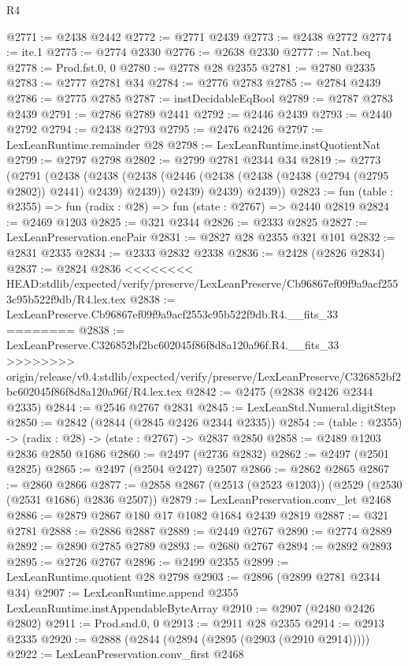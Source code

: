 \begin{lexlean}{R4}
\begin{coremodule}
{{{{{{{{{{{{{{{{{{{{{{{{{{{{{{{{{{{{{{{{{{{{{{{{{{{{{{{{{{{{{{{{{{{{{{{{{{{{{{{{{{{{{{{{{{{{@2771 := @2438 @2442
@2772 := @2771 @2439
@2773 := @2438 @2772
@2774 := ite.{1}
@2775 := @2774 @2330
@2776 := @2638 @2330
@2777 := Nat.beq
@2778 := Prod.fst.{0, 0}
@2780 := @2778 @28 @2355
@2781 := @2780 @2335
@2783 := @2777 @2781 @34
@2784 := @2776 @2783
@2785 := @2784 @2439
@2786 := @2775 @2785
@2787 := instDecidableEqBool
@2789 := @2787 @2783 @2439
@2791 := @2786 @2789 @2441
@2792 := @2446 @2439
@2793 := @2440 @2792
@2794 := @2438 @2793
@2795 := @2476 @2426
@2797 := LexLeanRuntime.remainder @28
@2798 := LexLeanRuntime.instQuotientNat
@2799 := @2797 @2798
@2802 := @2799 @2781 @2344 @34
@2819 := @2773
    (@2791
      (@2438
        (@2438
          (@2438 (@2446 (@2438 (@2438 (@2438 (@2794 (@2795 @2802)) @2441) @2439) @2439)) @2439)
          @2439)
        @2439))
@2823 := fun (table : @2355) => fun (radix : @28) => fun (state : @2767) => @2440 @2819
@2824 := @2469 @1203
@2825 := @321 @2344
@2826 := @2333 @2825
@2827 := LexLeanPreservation.encPair
@2831 := @2827 @28 @2355 @321 @101
@2832 := @2831 @2335
@2834 := @2333 @2832 @2338
@2836 := @2428 (@2826 @2834)
@2837 := @2824 @2836
<<<<<<<< HEAD:stdlib/expected/verify/preserve/LexLeanPreserve/Cb96867ef09f9a9acf2553c95b522f9db/R4.lex.tex
@2838 := LexLeanPreserve.Cb96867ef09f9a9acf2553c95b522f9db.R4.__fits_33
========
@2838 := LexLeanPreserve.C326852bf2bc602045f86f8d8a120a96f.R4.__fits_33
>>>>>>>> origin/release/v0.4:stdlib/expected/verify/preserve/LexLeanPreserve/C326852bf2bc602045f86f8d8a120a96f/R4.lex.tex
@2842 := @2475 (@2838 @2426 @2344 @2335)
@2844 := @2546 @2767 @2831
@2845 := LexLeanStd.Numeral.digitStep
@2850 := @2842 (@2844 (@2845 @2426 @2344 @2335))
@2854 := (table : @2355) -> (radix : @28) -> (state : @2767) -> @2837 @2850
@2858 := @2489 @1203 @2836 @2850 @1686
@2860 := @2497 (@2736 @2832)
@2862 := @2497 (@2501 @2825)
@2865 := @2497 (@2504 @2427) @2507
@2866 := @2862 @2865
@2867 := @2860 @2866
@2877 := @2858 @2867 (@2513 (@2523 @1203)) (@2529 (@2530 (@2531 @1686) @2836 @2507))
@2879 := LexLeanPreservation.conv_let @2468
@2886 := @2879 @2867 @180 @17 @1082 @1684 @2439 @2819
@2887 := @321 @2781
@2888 := @2886 @2887
@2889 := @2449 @2767
@2890 := @2774 @2889
@2892 := @2890 @2785 @2789
@2893 := @2680 @2767
@2894 := @2892 @2893
@2895 := @2726 @2767
@2896 := @2499 @2355
@2899 := LexLeanRuntime.quotient @28 @2798
@2903 := @2896 (@2899 @2781 @2344 @34)
@2907 := LexLeanRuntime.append @2355 LexLeanRuntime.instAppendableByteArray
@2910 := @2907 (@2480 @2426 @2802)
@2911 := Prod.snd.{0, 0}
@2913 := @2911 @28 @2355
@2914 := @2913 @2335
@2920 := @2888 (@2844 (@2894 (@2895 (@2903 (@2910 @2914)))))
@2922 := LexLeanPreservation.conv_first @2468
}}}}}}}}}}}}}}}}}}}}}}}}}}}}}}}}}}}}}}}}}}}}}}}}}}}}}}}}}}}}}}}}}}}}}}}}}}}}}}}}}}}}}}}}}}}}
\end{coremodule}
\end{lexlean}
